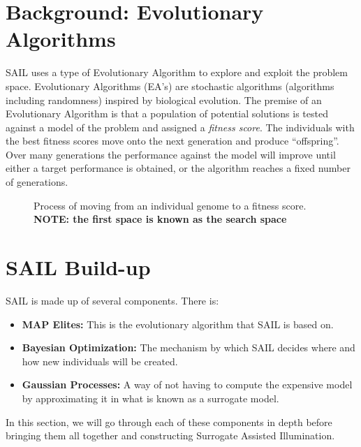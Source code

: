 \documentclass{sig-alternate}
\begin{document}

\section{Background: Evolutionary Algorithms}
\label{sec:evolutionaryAlgorithms}

SAIL uses a type of Evolutionary Algorithm to explore and exploit the problem space.
Evolutionary Algorithms (EA's) are stochastic algorithms (algorithms including randomness) inspired by biological evolution.
The premise of an Evolutionary Algorithm is that a population of potential solutions is tested against a model of the problem and assigned a \textit{fitness score}.
The individuals with the best fitness scores move onto the next generation and produce ``offspring''.
Over many generations the performance against the model will improve until either a target performance is obtained, or the algorithm reaches a fixed number of generations. 


\begin{figure*}[th]
\centering
{}
\caption{Process of moving from an individual genome to a fitness score. \textbf{NOTE: the first space is known as the search space}}
\label{fig:genome-to-fitness}
\end{figure*}

\section{SAIL Build-up}
\label{sec:SAILBuildUp}
SAIL is made up of several components. There is:
\begin{itemize}
  \item \textbf{MAP Elites:} This is the evolutionary algorithm that SAIL is based on.
  \item \textbf{Bayesian Optimization:} The mechanism by which SAIL decides where and how new individuals will be created.
  \item \textbf{Gaussian Processes:} A way of not having to compute the expensive model by approximating it in what is known as a surrogate model.
\end{itemize}
In this section, we will go through each of these components in depth before bringing them all together and constructing Surrogate Assisted Illumination.
\end{document}

